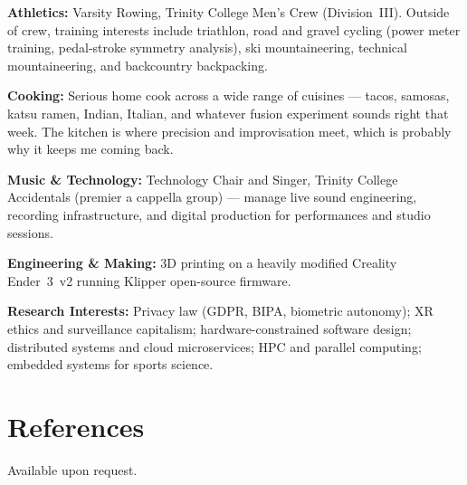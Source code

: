 \documentclass[10pt, letterpaper]{article}
\begin{document}
\textbf{Athletics:} Varsity Rowing, Trinity College Men's Crew (Division~III). Outside of crew, training interests include triathlon,
road and gravel cycling (power meter training, pedal-stroke symmetry analysis), ski mountaineering,
technical mountaineering, and backcountry backpacking.

\vspace{4pt}
\textbf{Cooking:} Serious home cook across a wide range of cuisines --- tacos, samosas, katsu
ramen, Indian, Italian, and whatever fusion experiment sounds right that week. The kitchen is
where precision and improvisation meet, which is probably why it keeps me coming back.

\vspace{4pt}
\textbf{Music \& Technology:} Technology Chair and Singer, Trinity College Accidentals (premier
a cappella group) --- manage live sound engineering, recording infrastructure, and digital
production for performances and studio sessions.

\vspace{4pt}
\textbf{Engineering \& Making:} 3D printing on a heavily modified Creality Ender~3~v2 running
Klipper open-source firmware.

\vspace{4pt}
\textbf{Research Interests:} Privacy law (GDPR, BIPA, biometric autonomy); XR ethics and
surveillance capitalism; hardware-constrained software design; distributed systems and cloud
microservices; HPC and parallel computing; embedded systems for sports science.

\section{References}

Available upon request.
\end{document}
